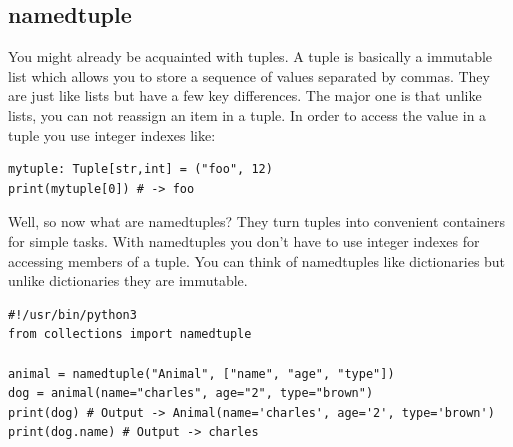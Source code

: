 \documentclass{report}
\begin{document}
    \pagebreak \bigbreak \noindent 
    \subsection{namedtuple}
    \bigbreak \noindent
    You might already be acquainted with tuples. A tuple is basically a immutable list which allows you to store a sequence of values separated by commas. They are just like lists but have a few key differences. The major one is that unlike lists, you can not reassign an item in a tuple. In order to access the value in a tuple you use integer indexes like:
    \begin{verbatim}
mytuple: Tuple[str,int] = ("foo", 12)
print(mytuple[0]) # -> foo
    \end{verbatim}
    Well, so now what are namedtuples? They turn tuples into convenient containers for simple tasks. With namedtuples you don’t have to use integer indexes for accessing members of a tuple. You can think of namedtuples like dictionaries but unlike dictionaries they are immutable.
    \begin{verbatim}
#!/usr/bin/python3
from collections import namedtuple

animal = namedtuple("Animal", ["name", "age", "type"])
dog = animal(name="charles", age="2", type="brown")
print(dog) # Output -> Animal(name='charles', age='2', type='brown')
print(dog.name) # Output -> charles
    \end{verbatim}
\end{document}
